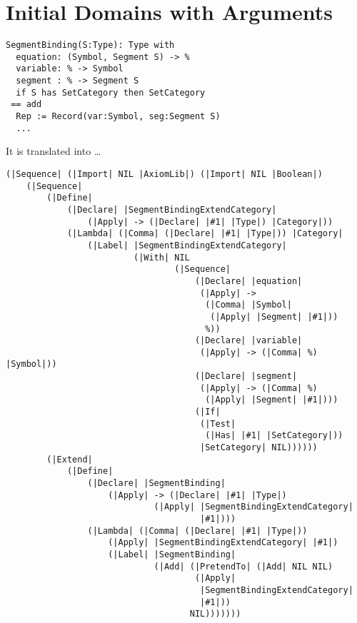 \documentclass{article}
\begin{document}
\section{Initial Domains with Arguments}
\label{sec:ParametrizedInitDomain}
\begin{verbatim}
SegmentBinding(S:Type): Type with
  equation: (Symbol, Segment S) -> %
  variable: % -> Symbol
  segment : % -> Segment S
  if S has SetCategory then SetCategory
 == add
  Rep := Record(var:Symbol, seg:Segment S)
  ...
\end{verbatim}
It is translated into \ldots
\begin{verbatim}
(|Sequence| (|Import| NIL |AxiomLib|) (|Import| NIL |Boolean|)
    (|Sequence|
        (|Define|
            (|Declare| |SegmentBindingExtendCategory|
                (|Apply| -> (|Declare| |#1| |Type|) |Category|))
            (|Lambda| (|Comma| (|Declare| |#1| |Type|)) |Category|
                (|Label| |SegmentBindingExtendCategory|
                         (|With| NIL
                                 (|Sequence|
                                     (|Declare| |equation|
                                      (|Apply| ->
                                       (|Comma| |Symbol|
                                        (|Apply| |Segment| |#1|))
                                       %))
                                     (|Declare| |variable|
                                      (|Apply| -> (|Comma| %) |Symbol|))
                                     (|Declare| |segment|
                                      (|Apply| -> (|Comma| %)
                                       (|Apply| |Segment| |#1|)))
                                     (|If|
                                      (|Test|
                                       (|Has| |#1| |SetCategory|))
                                      |SetCategory| NIL))))))
        (|Extend|
            (|Define|
                (|Declare| |SegmentBinding|
                    (|Apply| -> (|Declare| |#1| |Type|)
                             (|Apply| |SegmentBindingExtendCategory|
                                      |#1|)))
                (|Lambda| (|Comma| (|Declare| |#1| |Type|))
                    (|Apply| |SegmentBindingExtendCategory| |#1|)
                    (|Label| |SegmentBinding|
                             (|Add| (|PretendTo| (|Add| NIL NIL)
                                     (|Apply|
                                      |SegmentBindingExtendCategory|
                                      |#1|))
                                    NIL)))))))
\end{verbatim}
\end{document}
